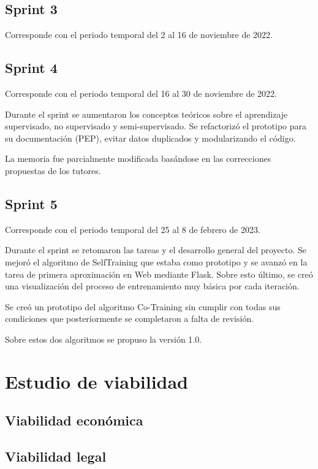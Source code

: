 \subsection{Sprint 3}

Corresponde con el periodo temporal del 2 al 16 de noviembre de 2022.

\subsection{Sprint 4}

Corresponde con el periodo temporal del 16 al 30 de noviembre de 2022.

Durante el sprint se aumentaron los conceptos teóricos sobre el aprendizaje
supervisado, no supervisado y semi-supervisado. Se refactorizó el prototipo para
su documentación (PEP), evitar datos duplicados y modularizando el código.

La memoria fue parcialmente modificada basándose en las correcciones propuestas
de los tutores.

\subsection{Sprint 5}

Corresponde con el periodo temporal del 25 al 8 de febrero de 2023.

Durante el sprint se retomaron las tareas y el desarrollo general del proyecto.
Se mejoró el algoritmo de SelfTraining que estaba como prototipo y se avanzó en
la tarea de primera aproximación en Web mediante Flask. Sobre esto último, se creó
una visualización del proceso de entrenamiento muy básica por cada iteración.

Se creó un prototipo del algoritmo Co-Training sin cumplir con todas sus
condiciones que posteriormente se completaron a falta de revisión. 

Sobre estos dos algoritmos se propuso la versión 1.0. 


\section{Estudio de viabilidad}

\subsection{Viabilidad económica}

\subsection{Viabilidad legal}


